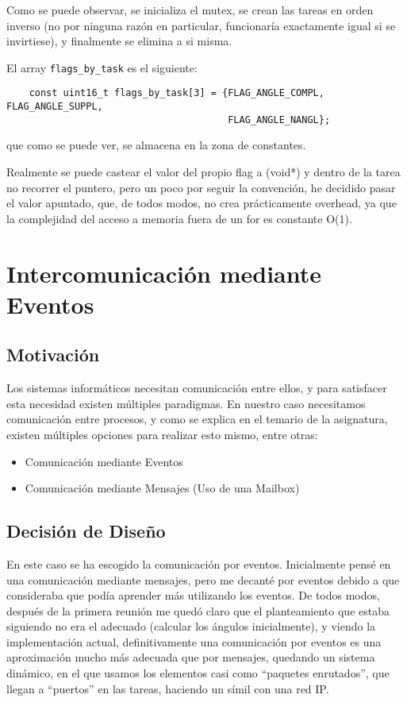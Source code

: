 \documentclass[a4paper,openright,12pt]{article}
\begin{document}
Como se puede observar, se inicializa el mutex, se crean las tareas en orden inverso (no por ninguna razón en particular, funcionaría exactamente igual si se invirtiese), 
y finalmente se elimina a si misma.

\bigskip

El array \texttt{flags\_by\_task} es el siguiente:
\begin{verbatim}
    const uint16_t flags_by_task[3] = {FLAG_ANGLE_COMPL, FLAG_ANGLE_SUPPL,
                                       FLAG_ANGLE_NANGL};
\end{verbatim}
que como se puede ver, se almacena en la zona de constantes.

Realmente se puede castear el valor del propio flag a (void*) y dentro de la tarea no recorrer el puntero, pero un poco por seguir la convención, he decidido pasar el valor apuntado, 
que, de todos modos, no crea prácticamente overhead, ya que la complejidad del acceso a memoria fuera de un for es constante O(1).


\clearpage
\section{Intercomunicación mediante Eventos}
\subsection{Motivación}
Los sistemas informáticos necesitan comunicación entre ellos, y para satisfacer esta necesidad existen múltiples paradigmas.
En nuestro caso necesitamos comunicación entre procesos, y como se explica en el temario de la asignatura, existen múltiples
opciones para realizar esto mismo, entre otras:
\begin{itemize}
    \item Comunicación mediante Eventos
    \item Comunicación mediante Mensajes (Uso de una Mailbox)
\end{itemize}

\subsection{Decisión de Diseño}
En este caso se ha escogido la comunicación por eventos. Inicialmente pensé en una comunicación mediante mensajes, pero me decanté por eventos debido a que consideraba que podía
aprender más utilizando los eventos. De todos modos, después de la primera reunión me quedó claro que el planteamiento que estaba siguiendo no era el adecuado (calcular los ángulos
inicialmente), y viendo la implementación actual, definitivamente una comunicación por eventos es una aproximación mucho más adecuada que por mensajes, quedando un sistema dinámico,
en el que usamos los elementos casi como ``paquetes enrutados'', que llegan a ``puertos'' en las tareas, haciendo un símil con una red IP.
\end{document}
